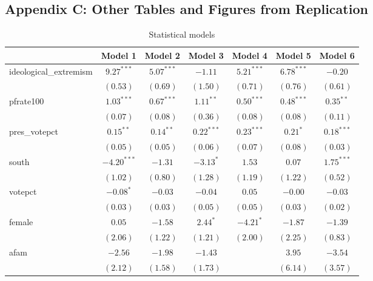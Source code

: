 \documentclass[12pt]{article}
\begin{document}
\subsection{Appendix C: Other Tables and Figures from Replication}
\begin{table}
	\begin{center}
		\caption{Statistical models}
		\begin{tabular}{l c c c c c c }
			\hline
			& Model 1 & Model 2 & Model 3 & Model 4 & Model 5 & Model 6 \\
			\hline
			ideological\_extremism & $9.27^{***}$  & $5.07^{***}$  & $-1.11$      & $5.21^{***}$ & $6.78^{***}$  & $-0.20$       \\
			& $(0.53)$      & $(0.69)$      & $(1.50)$     & $(0.71)$     & $(0.76)$      & $(0.61)$      \\
			pfrate100              & $1.03^{***}$  & $0.67^{***}$  & $1.11^{**}$  & $0.50^{***}$ & $0.48^{***}$  & $0.35^{**}$   \\
			& $(0.07)$      & $(0.08)$      & $(0.36)$     & $(0.08)$     & $(0.08)$      & $(0.11)$      \\
			pres\_votepct          & $0.15^{**}$   & $0.14^{**}$   & $0.22^{***}$ & $0.23^{***}$ & $0.21^{*}$    & $0.18^{***}$  \\
			& $(0.05)$      & $(0.05)$      & $(0.06)$     & $(0.07)$     & $(0.08)$      & $(0.03)$      \\
			south                  & $-4.20^{***}$ & $-1.31$       & $-3.13^{*}$  & $1.53$       & $0.07$        & $1.75^{***}$  \\
			& $(1.02)$      & $(0.80)$      & $(1.28)$     & $(1.19)$     & $(1.22)$      & $(0.52)$      \\
			votepct                & $-0.08^{*}$   & $-0.03$       & $-0.04$      & $0.05$       & $-0.00$       & $-0.03$       \\
			& $(0.03)$      & $(0.03)$      & $(0.05)$     & $(0.05)$     & $(0.03)$      & $(0.02)$      \\
			female                 & $0.05$        & $-1.58$       & $2.44^{*}$   & $-4.21^{*}$  & $-1.87$       & $-1.39$       \\
			& $(2.06)$      & $(1.22)$      & $(1.21)$     & $(2.00)$     & $(2.25)$      & $(0.83)$      \\
			afam                   & $-2.56$       & $-1.98$       & $-1.43$      &              & $3.95$        & $-3.54$       \\
			& $(2.12)$      & $(1.58)$      & $(1.73)$     &              & $(6.14)$      & $(3.57)$      \\

\end{tabular}
\end{center}
\end{table}
\end{document}
